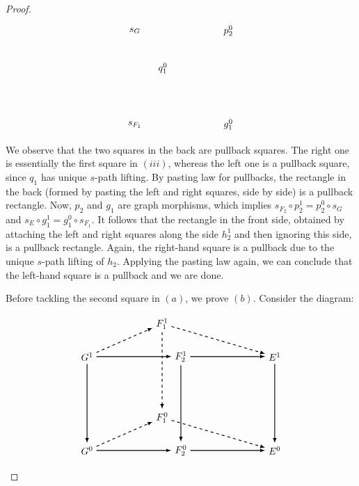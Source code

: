 \documentclass[10pt,a4paper]{amsart}
\begin{document}
\begin{proof}
\[\begin{tikzpicture}[scale=1.7]
\node at (0.8,0.5) {$s_G$};
\node at (0.8,-1.5) {$s_{F_1}$};
\node at (2.8,0.5) {$p_2^0$};
\node at (2.8,-1.5) {$g_1^0$};

\node at (1.4,-0.3) {$q_1^0$};

\end{tikzpicture}
\]
We observe that the two squares in the back are pullback squares. The right one is essentially the first square in $(iii)$, whereas the left one is a pullback square, since $q_1$ has unique $s$-path lifting. By pasting law for pullbacks, the rectangle in the back (formed by pasting the left and right squares, side by side) is a pullback rectangle. Now, $p_2$ and $g_1$ are graph morphisms, which implies $s_{F_2}\circ p_2^1=p_2^0\circ s_G$ and $s_E\circ g_1^1=g_1^0\circ s_{F_1}$. It follows that the rectangle in the front side, obtained by attaching the left and right squares along the side $h_2^1$ and then ignoring this side, is a pullback rectangle. Again, the right-hand square is a pullback due to the unique $s$-path lifting of $h_2$. Applying the pasting law again, we can conclude that the left-hand square is a pullback and we are done. 

Before tackling the second square in $(a)$, we prove $(b)$. Consider the diagram:

\[
\begin{tikzpicture}[scale=1.7]
\node[] (A1) at (0,0) {$G^1$};
\node[] (A2) at (2,0) {$F_2^1$};
\node[] (A3) at (0,-2) {$G^0$};
\node[] (A4) at (2,-2) {$F_2^0$};

\node[] (B1) at (1.6,0.7) {$F_1^1$};
\node[] (B2) at (4,0) {$E^1$};
\node[] (B3) at (1.6,-1.3) {$F_1^0$};
\node[] (B4) at (4,-2) {$E^0$};

\path[->, black, >=latex,thick] (A1) edge [] node[]{} (A2);
\path[->, black, >=latex,thick] (A3) edge [] node[]{} (A4);
\path[->, black, >=latex,thick] (A1) edge [] node[]{} (A3);
\path[->, black, >=latex,thick] (A2) edge [] node[]{} (A4);

\path[->,black, dashed, >=latex,thick] (B1) edge [] node[]{} (B3);
\path[->,black, >=latex,thick] (A4) edge [] node[]{} (B4);
\path[->,black, >=latex,thick] (A2) edge [] node[]{} (B2);
\path[->,black, >=latex,thick] (B2) edge [] node[]{} (B4);

\path[->,black, dashed, >=latex,thick] (A1) edge [] node {} (B1);
\path[->,black, dashed, >=latex,thick] (A3) edge [] node {} (B3);
\path[->,black, dashed, >=latex,thick] (B1) edge [] node {} (B2);
\path[->,black, dashed, >=latex,thick] (B3) edge [] node {} (B4);


\end{tikzpicture}\]
\end{proof}
\end{document}
